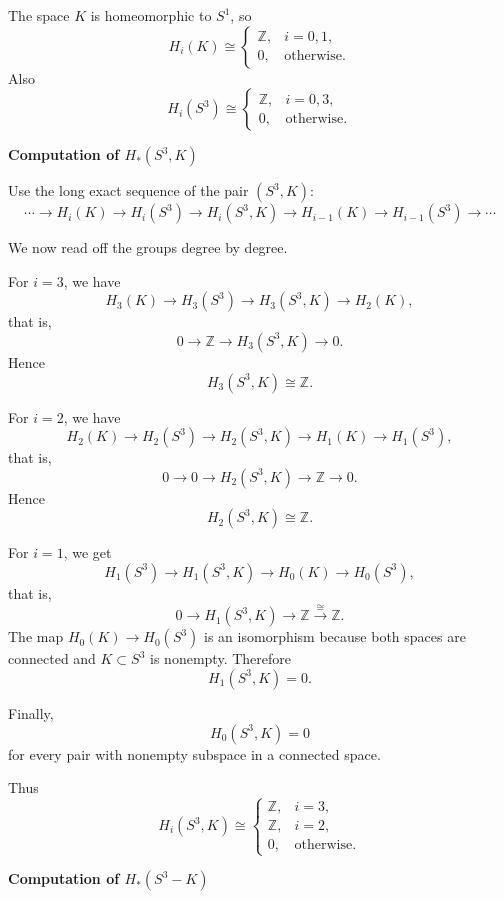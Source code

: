 \begin{solution}
The space \(K\) is homeomorphic to \(S^1\), so
\[
H_i(K)\cong
\begin{cases}
	\mathbb Z, & i=0,1,\\
	0, & \text{otherwise}.
\end{cases}
\]
Also
\[
H_i(S^3)\cong
\begin{cases}
	\mathbb Z, & i=0,3,\\
	0, & \text{otherwise}.
\end{cases}
\]


\medskip
\noindent\textbf{Computation of \(H_*(S^3,K)\)}\par
\smallskip


Use the long exact sequence of the pair \((S^3,K)\):
\[
\cdots \to H_i(K)\to H_i(S^3)\to H_i(S^3,K)\to H_{i-1}(K)\to H_{i-1}(S^3)\to \cdots
\]

We now read off the groups degree by degree.

For \(i=3\), we have
\[
H_3(K)\to H_3(S^3)\to H_3(S^3,K)\to H_2(K),
\]
that is,
\[
0\to \mathbb Z \to H_3(S^3,K)\to 0.
\]
Hence
\[
H_3(S^3,K)\cong \mathbb Z.
\]

For \(i=2\), we have
\[
H_2(K)\to H_2(S^3)\to H_2(S^3,K)\to H_1(K)\to H_1(S^3),
\]
that is,
\[
0\to 0 \to H_2(S^3,K)\to \mathbb Z \to 0.
\]
Hence
\[
H_2(S^3,K)\cong \mathbb Z.
\]

For \(i=1\), we get
\[
H_1(S^3)\to H_1(S^3,K)\to H_0(K)\to H_0(S^3),
\]
that is,
\[
0\to H_1(S^3,K)\to \mathbb Z \xrightarrow{\cong} \mathbb Z.
\]
The map \(H_0(K)\to H_0(S^3)\) is an isomorphism because both spaces are connected and \(K\subset S^3\) is nonempty. Therefore
\[
H_1(S^3,K)=0.
\]

Finally,
\[
H_0(S^3,K)=0
\]
for every pair with nonempty subspace in a connected space.

Thus
\[
H_i(S^3,K)\cong
\begin{cases}
	\mathbb Z, & i=3,\\[1mm]
	\mathbb Z, & i=2,\\[1mm]
	0, & \text{otherwise}.
\end{cases}
\]


\medskip
\noindent\textbf{Computation of \(H_*(S^3-K)\)}\par
\smallskip



\end{solution}
